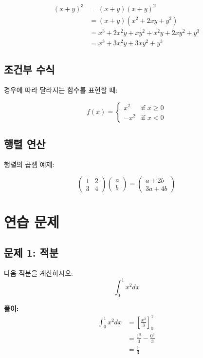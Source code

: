 \documentclass[12pt,a4paper]{article}
\begin{document}
\begin{align}
    (x+y)^3 &= (x+y)(x+y)^2 \\
            &= (x+y)(x^2 + 2xy + y^2) \\
            &= x^3 + 2x^2y + xy^2 + x^2y + 2xy^2 + y^3 \\
            &= x^3 + 3x^2y + 3xy^2 + y^3
\end{align}

\subsection{조건부 수식}
경우에 따라 달라지는 함수를 표현할 때:

\[
f(x) = \begin{cases}
    x^2 & \text{if } x \geq 0 \\
    -x^2 & \text{if } x < 0
\end{cases}
\]

\subsection{행렬 연산}
행렬의 곱셈 예제:

\[
\begin{pmatrix}
    1 & 2 \\
    3 & 4
\end{pmatrix}
\begin{pmatrix}
    a \\
    b
\end{pmatrix}
=
\begin{pmatrix}
    a + 2b \\
    3a + 4b
\end{pmatrix}
\]

\section{연습 문제}

\subsection{문제 1: 적분}
다음 적분을 계산하시오:
\[
    \int_0^1 x^2 dx
\]

\textbf{풀이:}
\begin{align}
    \int_0^1 x^2 dx &= \left[ \frac{x^3}{3} \right]_0^1 \tag{적분 공식} \\
                     &= \frac{1^3}{3} - \frac{0^3}{3} \nonumber \\
                     &= \frac{1}{3}
\end{align}
\end{document}
